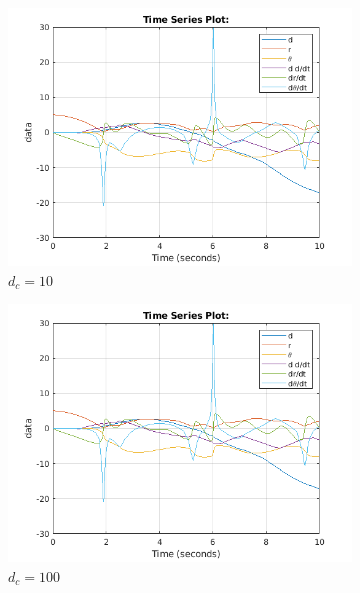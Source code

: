 \documentclass[10pt,a4paper,notitlepage]{article}
\begin{document}
\begin{figure}[H]
  \centering 
\begin{subfigure}{0.5\textwidth}
  \centering
  \includegraphics[width=\textwidth]{NL_correcL10.png}
  \caption{$d_c=10$}
  \label{fig:label}
\end{subfigure}%
\begin{subfigure}{0.5\textwidth}
  \centering
  \includegraphics[width=\linewidth]{NL_correcL100.png}
  \caption{$d_c=100$}
  \label{fig:label}
\end{subfigure}\\
\begin{subfigure}{0.5\textwidth}
  \centering

\end{subfigure}
\end{figure}
\end{document}
